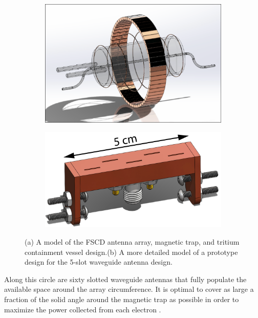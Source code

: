 \begin{figure}[htbp]
    \centering
    \begin{subfigure}{0.5\textwidth}
        \includegraphics*[width=\textwidth]{figs/Chapter-3/230614_fscd_render.png}
        \caption{}
    \end{subfigure}
    \hfill
    \begin{subfigure}{0.4\textwidth}
        \includegraphics*[width=\textwidth]{figs/Chapter-3/230614_5slot_model.png}
        \caption{}
    \end{subfigure}
    \caption{\label{fig:chap3-fscd-render} (a) A model of the FSCD antenna array, magnetic trap, and tritium containment vessel design.(b) A more detailed model of a prototype design for the 5-slot waveguide antenna design.}
\end{figure}
Along this circle are sixty slotted waveguide antennas that fully populate the available space around the array circumference. It is optimal to cover as large a fraction of the solid angle around the magnetic trap as possible in order to maximize the power collected from each electron . 

